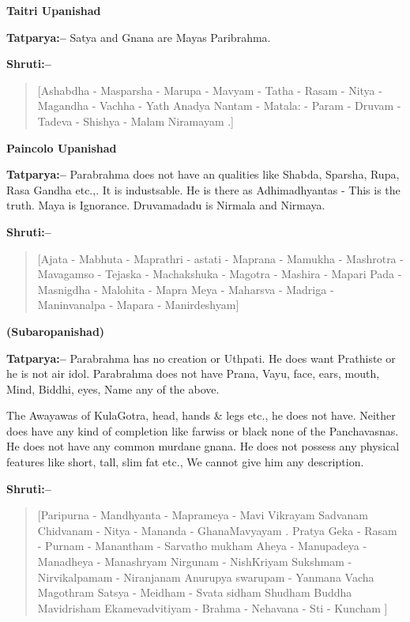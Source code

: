 \begin{flushright}
\textbf{Taitri Upanishad}
\end{flushright}

\textbf{Tatparya:–} Satya and Gnana are Mayas Paribrahma.

\textbf{Shruti:–}

\begin{verse}
[Ashabdha - Masparsha - Marupa - Mavyam - Tatha - Rasam - Nitya - Magandha - Vachha - Yath  Anadya Nantam - Matala: - Param - Druvam -Tadeva - Shishya - Malam Niramayam .]
\end{verse}

\begin{flushright}
\textbf{Paincolo Upanishad}
\end{flushright}

\textbf{Tatparya:–} Parabrahma does not have an qualities like Shabda, Sparsha, Rupa, Rasa Gandha etc.,. It is industsable. He is there as Adhimadhyantas - This is the truth. Maya is Ignorance. Druvamadadu is Nirmala and Nirmaya.

\textbf{Shruti:–}

\begin{verse}
[Ajata - Mabhuta - Maprathri - astati - Maprana - Mamukha - Mashrotra - Mavagamso - Tejaska - Machakshuka - Magotra - Mashira - Mapari Pada - Masnigdha - Malohita - Mapra Meya - Maharsva - Madriga - Maninvanalpa - Mapara - Manirdeshyam]
\end{verse}

\begin{flushright}
\textbf{(Subaropanishad)}
\end{flushright}

\textbf{Tatparya:–} Parabrahma has no creation or Uthpati. He does want Prathiste or he is not air idol. Parabrahma does not have Prana, Vayu, face, ears, mouth, Mind, Biddhi, eyes, Name any of the above.

The Awayawas of KulaGotra, head, hands \& legs etc., he does not have. Neither does have any kind of completion like farwiss or black none of the Panchavasnas. He does not have any common murdane gnana. He does not possess any physical features like short, tall, slim fat etc., We cannot give him any description.

\newpage

\textbf{Shruti:–}

\begin{verse}
[Paripurna - Mandhyanta - Maprameya - Mavi Vikrayam \break Sadvanam Chidvanam - Nitya - Mananda - Ghana\break Mavyayam . Pratya Geka - Rasam - Purnam - Manantham - Sarvatho mukham  Aheya - Manupadeya - Manadheya - Manashryam  Nirgunam - NishKriyam Sukshmam - Nirvikalpamam - Niranjanam  Anurupya swarupam - Yanmana Vacha Magothram  Satsya - Meidham - Svata sidham Shudham Buddha Mavi\break drisham  Ekamevadvitiyam - Brahma - Nehavana - Sti - Kuncham ]
\end{verse}

